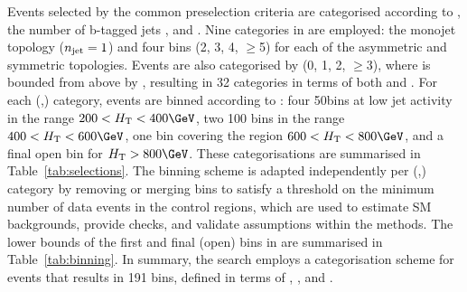 Events selected by the common preselection criteria are categorised
according to \njet, the number of b-tagged jets \nb, and \scalht. Nine
categories in \njet are employed: the monojet topology ($\njet = 1$)
and four \njet bins (2, 3, 4, $\geq$5) for each of the asymmetric and
symmetric topologies. Events are also categorised by \nb (0, 1, 2,
$\geq$3), where \nb is bounded from above by \njet, resulting in 32
categories in terms of both \njet and \nb. For each (\njet,\nb)
category, events are binned according to \scalht: four 50\GeV bins at
low jet activity in the range $200 < \scalht < 400\GeV$, two 100\GeV
bins in the range $400 < \scalht < 600\GeV$, one bin covering the
region $600 < \scalht < 800\GeV$, and a final open bin for $\scalht >
800\GeV$. These categorisations are summarised in
Table~\ref{tab:selections}. The \scalht binning scheme is adapted
independently per (\njet,\nb) category by removing or merging bins to
satisfy a threshold on the minimum number of data events in the
control regions, which are used to estimate SM backgrounds, provide
checks, and validate assumptions within the methods. The lower bounds
of the first and final (open) bins in \scalht are summarised in
Table~\ref{tab:binning}. In summary, the search employs a
categorisation scheme for events that results in 191 bins, defined in
terms of \njet, \nb, and \scalht.

